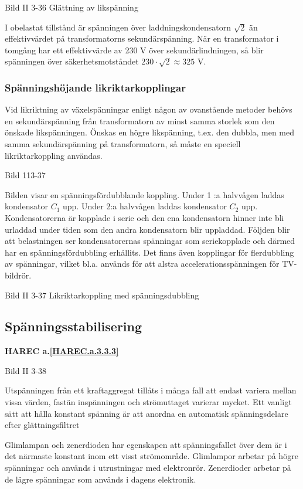 Bild II 3-36 Glättning av likspänning

I obelastat tillstånd är spänningen över laddningskondensatorn
\(\sqrt{2}\) än effektivvärdet på transformatorns
sekundärspänning. När en transformator i tomgång har ett effektivvärde
av 230 V över sekundärlindningen, så blir spänningen över
säkerhetsmotståndet \(230\cdot\sqrt{2} \approx 325\) V.

\subsubsection{Spänningshöjande likriktarkopplingar}

Vid likriktning av växelspänningar enligt någon av ovanstående metoder
behövs en sekundärspänning från transformatorn av minst samma storlek
som den önskade likspänningen. Önskas en högre likspänning, t.ex. den
dubbla, men med samma sekundärspänning på transformatorn, så måste en
speciell likriktarkoppling användas.

Bild 113-37

Bilden visar en spänningsfördubblande koppling. Under 1 :a halvvågen
laddas kondensator \(C_1\) upp. Under 2:a halvvågen laddas kondensator
\(C_2\) upp. Kondensatorerna är kopplade i serie och den ena
kondensatorn hinner inte bli urladdad under tiden som den andra
kondensatorn blir uppladdad. Följden blir att belastningen ser
kondensatorernas spänningar som seriekopplade och därmed har en
spänningsfördubbling erhållits. Det finns även kopplingar för
flerdubbling av spänningar, vilket bl.a. används för att alstra
accelerationsspänningen för TV-bildrör.

Bild II 3-37 Likriktarkoppling med spänningsdubbling

\subsection{Spänningsstabilisering}
\textbf{HAREC a.\ref{HAREC.a.3.3.3}\label{myHAREC.a.3.3.3}}

Bild II 3-38

Utspänningen från ett kraftaggregat tillåts i många fall att endast
variera mellan vissa värden, fastän inspänningen och strömuttaget
varierar mycket. Ett vanligt sätt att hålla konstant spänning är att
anordna en automatisk spänningsdelare efter glättningsfiltret

Glimlampan och zenerdioden har egenskapen att spänningsfallet över dem
är i det närmaste konstant inom ett visst strömområde. Glimlampor
arbetar på högre spänningar och används i utrustningar med
elektronrör. Zenerdioder arbetar på de lägre spänningar som används i
dagens elektronik.

